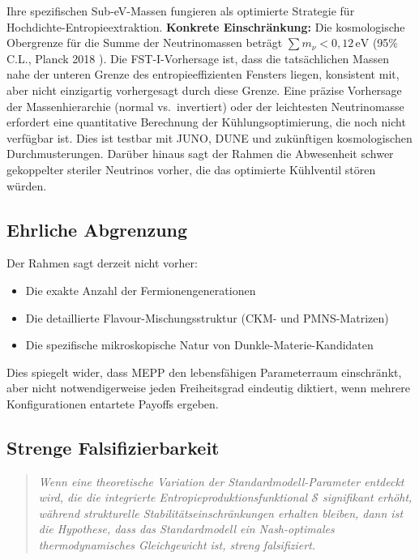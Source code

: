\documentclass[12pt,a4paper]{article}
\theoremstyle{remark}
\begin{document}
Ihre spezifischen Sub-eV-Massen fungieren als optimierte Strategie f\"ur Hochdichte-Entropieextraktion. \textbf{Konkrete Einschr\"ankung:} Die kosmologische Obergrenze f\"ur die Summe der Neutrinomassen betr\"agt $\sum m_\nu < 0{,}12\,\text{eV}$ (95\% C.L., Planck 2018 \citep{Planck2018}). Die FST-I-Vorhersage ist, dass die tats\"achlichen Massen nahe der unteren Grenze des entropieeffizienten Fensters liegen, konsistent mit, aber nicht einzigartig vorhergesagt durch diese Grenze. Eine pr\"azise Vorhersage der Massenhierarchie (normal vs.\ invertiert) oder der leichtesten Neutrinomasse erfordert eine quantitative Berechnung der K\"uhlungsoptimierung, die noch nicht verf\"ugbar ist. Dies ist testbar mit JUNO, DUNE und zuk\"unftigen kosmologischen Durchmusterungen. Dar\"uber hinaus sagt der Rahmen die Abwesenheit schwer gekoppelter steriler Neutrinos vorher, die das optimierte K\"uhlventil st\"oren w\"urden.

\subsection{Ehrliche Abgrenzung}

Der Rahmen sagt derzeit nicht vorher:
\begin{itemize}
    \item Die exakte Anzahl der Fermionengenerationen
    \item Die detaillierte Flavour-Mischungsstruktur (CKM- und PMNS-Matrizen)
    \item Die spezifische mikroskopische Natur von Dunkle-Materie-Kandidaten
\end{itemize}

Dies spiegelt wider, dass MEPP den lebensfähigen Parameterraum einschr\"ankt, aber nicht notwendigerweise jeden Freiheitsgrad eindeutig diktiert, wenn mehrere Konfigurationen entartete Payoffs ergeben.

\subsection{Strenge Falsifizierbarkeit}

\begin{quote}
\textit{Wenn eine theoretische Variation der Standardmodell-Parameter entdeckt wird, die die integrierte Entropieproduktionsfunktional $\mathcal{S}$ signifikant erh\"oht, w\"ahrend strukturelle Stabilit\"atseinschr\"ankungen erhalten bleiben, dann ist die Hypothese, dass das Standardmodell ein Nash-optimales thermodynamisches Gleichgewicht ist, streng falsifiziert.}
\end{quote}
\end{document}
